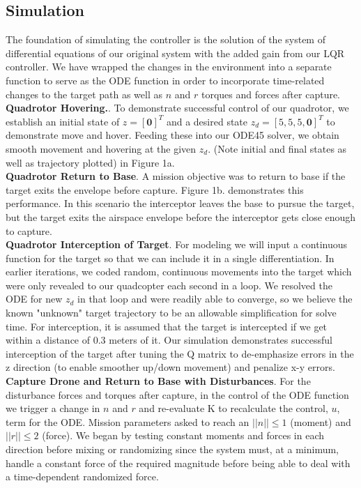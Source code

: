 \documentclass{article}
\begin{document}
\begin{multicols}{2}
\section*{Simulation}
\noindent
The foundation of simulating the controller is the solution of the system of differential equations of our original system with the added 
gain from our LQR controller.  We have wrapped the changes in the environment into a separate function to serve as the ODE 
function in order to incorporate time-related changes to the target path as well as $n$ and $r$ torques and forces after capture.\\
\textbf{Quadrotor Hovering.}. To demonstrate successful control of our quadrotor, we establish an initial state of $z=[\mathbf{0}]^T$ and 
a desired state $z_d=[5,5,5,\boldsymbol{0}]^T $ to demonstrate move and hover.  Feeding these into our ODE45 solver, we obtain 
smooth movement and hovering at the given $z_d$.  (Note initial and final states as well as trajectory plotted) in Figure 1a.\\
\textbf{Quadrotor Return to Base}. A mission objective was to return to base if the target exits the envelope before capture.  
Figure 1b. demonstrates this performance. In this scenario the interceptor leaves the base to pursue the target, but the target exits 
the airspace envelope before the interceptor gets close enough to capture.\\
\textbf{Quadrotor Interception of Target}. For modeling we will input a continuous function for the target so that we can include it in a single differentiation.  In earlier iterations, we coded random, continuous movements into the target which were only 
revealed to our quadcopter each second in a loop.  We resolved the ODE for new $z_d$ in that loop and were readily able to converge, so we believe the known "unknown" target trajectory to be an allowable simplification for solve time. For interception, it is assumed that the target is intercepted if we get within a distance of 0.3 meters of it. Our simulation demonstrates successful interception of the target after tuning the Q matrix to de-emphasize errors in the z direction (to enable smoother up/down 
movement) and penalize x-y errors.  \\
\textbf{Capture Drone and Return to Base  with Disturbances}.  For the disturbance 
forces and torques after capture,  in the control of the ODE function we trigger a 
change in $n$ and $r$ and re-evaluate K  to recalculate the control, $u$, term for the 
ODE.  Mission parameters asked to reach an $||n||\leq1$ (moment) and $||r||\leq2$ (force). We began by testing constant moments and forces in each direction before mixing or randomizing since the system must, at a minimum, handle a constant force of the required magnitude before being able to deal with a time-dependent randomized force.

\end{multicols}
\end{document}
